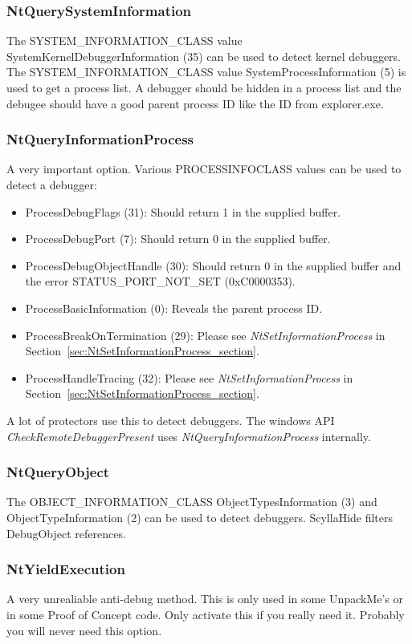 \documentclass[10pt,a4paper]{article}
\begin{document}
\subsubsection{NtQuerySystemInformation}
The SYSTEM\_INFORMATION\_CLASS value SystemKernelDebuggerInformation (35) can be used to detect kernel debuggers. The SYSTEM\_INFORMATION\_CLASS value SystemProcessInformation (5) is used to get a process list. A debugger should be hidden in a process list and the debugee should have a good parent process ID like the ID from explorer.exe.

\subsubsection{NtQueryInformationProcess}
A very important option. Various PROCESSINFOCLASS values can be used to detect a debugger:
\begin{itemize}
\item ProcessDebugFlags (31): Should return 1 in the supplied buffer.
\item ProcessDebugPort (7): Should return 0 in the supplied buffer.
\item ProcessDebugObjectHandle (30): Should return 0 in the supplied buffer and the error STATUS\_PORT\_NOT\_SET (0xC0000353).
\item ProcessBasicInformation (0): Reveals the parent process ID.
\item ProcessBreakOnTermination (29): Please see \textit{NtSetInformationProcess} in Section~\ref{sec:NtSetInformationProcess_section}.
\item ProcessHandleTracing (32): Please see \textit{NtSetInformationProcess} in Section~\ref{sec:NtSetInformationProcess_section}.
\end{itemize}
A lot of protectors use this to detect debuggers. The windows API \textit{CheckRemoteDebuggerPresent} uses \textit{NtQueryInformationProcess} internally.

\subsubsection{NtQueryObject}
The OBJECT\_INFORMATION\_CLASS ObjectTypesInformation (3) and ObjectTypeInformation (2) can be used to detect debuggers. ScyllaHide filters DebugObject references.

\subsubsection{NtYieldExecution}
A very unrealiable anti-debug method. This is only used in some UnpackMe's or in some Proof of Concept code. Only activate this if you really need it. Probably you will never need this option.
\end{document}
